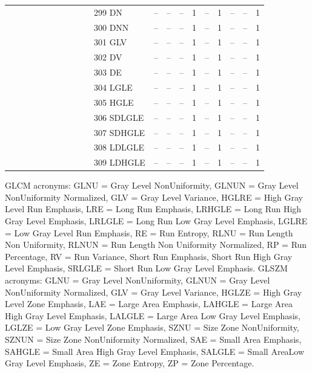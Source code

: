 \documentclass[sn-mathphys,Numbered]{sn-jnl}%
\theoremstyle{thmstyleone}%
\theoremstyle{thmstyletwo}%
\theoremstyle{thmstylethree}%
\begin{document}
\begin{table}[!hbt]
\begin{tiny}
\begin{tabular} { l  c  c  c  c  c  c  c  c  c    l  c  c  c  c  c  c  c  c  c }
   &  &   &   &   &   &   &   &  &   &  299 DN & -- &  -- &  -- &  1 &  -- &  1 &  -- & -- & 1 \\
   &  &   &   &   &   &   &   &  &   &  300 DNN & -- &  -- &  -- &  1 &  -- &  1 &  -- & -- & 1 \\
   &  &   &   &   &   &   &   &  &   &  301 GLV & -- &  -- &  -- &  1 &  -- &  1 &  -- & -- & 1 \\
   &  &   &   &   &   &   &   &  &   &  302 DV & -- &  -- &  -- &  1 &  -- &  1 &  -- & -- & 1 \\
   &  &   &   &   &   &   &   &  &   &  303 DE & -- &  -- &  -- &  1 &  -- &  1 &  -- & -- & 1 \\
   &  &   &   &   &   &   &   &  &   &  304 LGLE & -- &  -- &  -- &  1 &  -- &  1 &  -- & -- & 1 \\
   &  &   &   &   &   &   &   &  &   &  305 HGLE & -- &  -- &  -- &  1 &  -- &  1 &  -- & -- & 1 \\
   &  &   &   &   &   &   &   &  &   &  306 SDLGLE & -- &  -- &  -- &  1 &  -- &  1 &  -- & -- & 1 \\
   &  &   &   &   &   &   &   &  &   &  307 SDHGLE & -- &  -- &  -- &  1 &  -- &  1 &  -- & -- & 1 \\
   &  &   &   &   &   &   &   &  &   &  308 LDLGLE & -- &  -- &  -- &  1 &  -- &  1 &  -- & -- & 1 \\
   &  &   &   &   &   &   &   &  &   &  309 LDHGLE & -- &  -- &  -- &  1 &  -- &  1 &  -- & -- & 1 \\

 \bottomrule
\end{tabular}
\end{tiny}

\vspace{1ex}
\begin{tiny}
{\raggedright
GLCM acronyms:
GLNU = Gray Level NonUniformity,
GLNUN = Gray Level NonUniformity Normalized,
GLV = Gray Level Variance,
HGLRE = High Gray Level Run Emphasis,
LRE = Long Run Emphasis,
LRHGLE = Long Run High Gray Level Emphasis,
LRLGLE = Long Run Low Gray Level Emphasis,
LGLRE = Low Gray Level Run Emphasis,
RE = Run Entropy,
RLNU = Run Length Non Uniformity,
RLNUN = Run Length Non Uniformity Normalized,
RP = Run Percentage,
RV = Run Variance,
Short Run Emphasis,
Short Run High Gray Level Emphasis,
SRLGLE = Short Run Low Gray Level Emphasis.
GLSZM acronyms:
GLNU = Gray Level NonUniformity,
GLNUN = Gray Level NonUniformity Normalized,
GLV = Gray Level Variance,
HGLZE = High Gray Level Zone Emphasis,
LAE = Large Area Emphasis,
LAHGLE = Large Area High Gray Level Emphasis,
LALGLE = Large Area Low Gray Level Emphasis,
LGLZE = Low Gray Level Zone Emphasis,
SZNU = Size Zone NonUniformity,
SZNUN = Size Zone NonUniformity Normalized,
SAE = Small Area Emphasis,
SAHGLE = Small Area High Gray Level Emphasis,
SALGLE = Small AreaLow Gray Level Emphasis,
ZE = Zone Entropy,
ZP = Zone Percentage.

\par}
\end{tiny}
\end{table}
\end{document}
